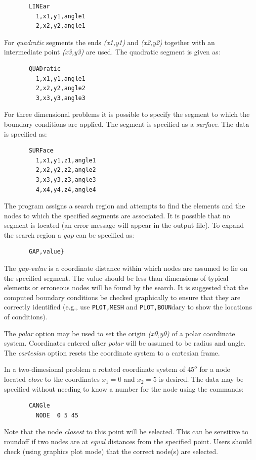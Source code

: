 \begin{verbatim}
       LINEar
         1,x1,y1,angle1
         2,x2,y2,angle1
\end{verbatim}

For {\it quadratic} segments the ends {\it (x1,y1)} and {\it (x2,y2)}
together with an intermediate point {\it (x3,y3)} are used.
The quadratic segment is given as:

\begin{verbatim}
       QUADratic
         1,x1,y1,angle1
         2,x2,y2,angle2
         3,x3,y3,angle3
\end{verbatim}

For three dimensional problems it is possible to
specify the segment to which the boundary conditions
are applied.  The segment is specified as a {\it surface}.
The data is specified as:

\begin{verbatim}
       SURFace
         1,x1,y1,z1,angle1
         2,x2,y2,z2,angle2
         3,x3,y3,z3,angle3
         4,x4,y4,z4,angle4
\end{verbatim}

The program assigns a search region and attempts to
find the elements and the nodes to which the specified
segments are associated.  It is possible that no segment
is located (an
error message will appear in the output file).  To
expand the search region a {\it gap} can be specified as:

\begin{verbatim}
       GAP,value}
\end{verbatim}
The {\it gap-value} is a coordinate distance within which
nodes are assumed to lie on the specified segment. The
value should be less than dimensions of typical elements
or erroneous nodes will be found by the search.
It is suggested that the computed boundary conditions
be checked graphically to ensure that they are
correctly identified (e.g., use {\tt PLOT,MESH} and {\tt PLOT,BOUN}dary
to show the locations of conditions).

The {\it polar} option may be used to set the origin {\it (x0,y0)} of a
polar coordinate system. Coordinates entered after
{\it polar} will be assumed to be radius and angle.  The
{\it cartesian} option resets the coordinate system to a
cartesian frame.


In a two-dimesional problem
a rotated coordinate system of $45^o$ for a node located \textit{close} to the
coordinates $x_1 = 0$ and $x_2 = 5$ is desired.  The data may be specified
without needing to know a number for the node using the commands:
\begin{verbatim}
       CANGle
         NODE  0 5 45

\end{verbatim}
Note that the node \textit{closest} to this point will be selected. This can
be sensitive to roundoff if two nodes are at \textit{equal} distances from
the specified point.  Users should check (using graphics plot mode) that
the correct node(s) are selected.
\vfil\eject
